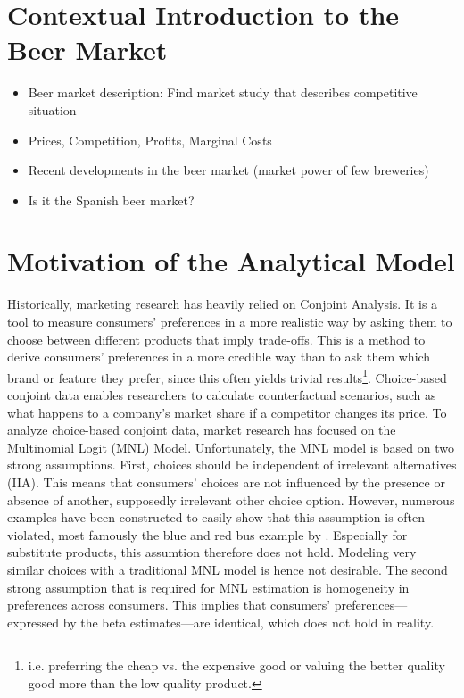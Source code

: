 \documentclass[12pt,a4paper]{article}
\begin{document}
\section{Contextual Introduction to the Beer Market}
\begin{itemize}
\item Beer market description: Find market study that describes competitive situation
\item Prices, Competition, Profits, Marginal Costs
\item Recent developments in the beer market (market power of few breweries)
\item Is it the Spanish beer market?
\end{itemize}

\section{Motivation of the Analytical Model} \label{sec_motivation}
Historically, marketing research has heavily relied on Conjoint Analysis.
It is a tool to measure consumers' preferences in a more realistic way by asking them to choose between different products that imply trade-offs.
This is a method to derive consumers' preferences in a more credible way than to ask them which brand or feature they prefer,
since this often yields trivial results\footnote{i.e. preferring the cheap vs. the expensive good or valuing the better quality good more than the low quality product.}.
Choice-based conjoint data enables researchers to calculate counterfactual scenarios, such as what happens to a company's market share if a competitor changes its price.
To analyze choice-based conjoint data, market research has focused on the Multinomial Logit (MNL) Model.
Unfortunately, the MNL model is based on two strong assumptions.
First, choices should be independent of irrelevant alternatives (IIA).
This means that consumers' choices are not influenced by the presence or absence of another, supposedly irrelevant other choice option.
However, numerous examples have been constructed to easily show that this assumption is often violated, most famously the blue and red bus example by \cite{mcfaddenConditionalLogitAnalysis1973}.
Especially for substitute products, this assumtion therefore does not hold. 
Modeling very similar choices with a traditional MNL model is hence not desirable.
The second strong assumption that is required for MNL estimation is homogeneity in preferences across consumers.
This implies that consumers' preferences---expressed by the beta estimates---are identical, which does not hold in reality. 
\end{document}
